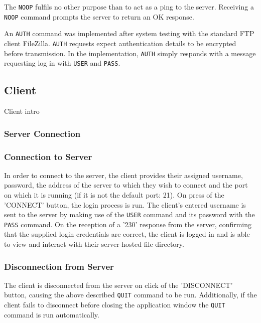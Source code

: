 \documentclass[10pt,twocolumn]{witseiepaper}
\begin{document}
The \texttt{NOOP} fulfils no other purpose than to act as a ping to the server. Receiving a \texttt{NOOP} command prompts the server to return an OK response.

An \texttt{AUTH} command was implemented after system testing with the standard FTP client FileZilla. \texttt{AUTH} requests expect authentication details to be encrypted before transmission. In the implementation, \texttt{AUTH} simply responds with a message requesting log in with \texttt{USER} and \texttt{PASS}.


\subsection{Client}



Client intro


\subsubsection{Server Connection}
\subsubsection*{Connection to Server}
In order to connect to the server, the client provides their assigned username, password, the address of the server to which they wish to connect and the port on which it is running (if it is not the default port: 21). On press of the 'CONNECT' button, the login process is run. The client's entered username is sent to the server by making use of the \texttt{USER} command and its password with the \texttt{PASS} command. On the reception of a '230' response from the server, confirming that the supplied login credentials are correct, the client is logged in and is able to view and interact with their server-hosted file directory.
 
\subsubsection*{Disconnection from Server} 
The client is disconnected from the server on click of the 'DISCONNECT' button, causing the above described \texttt{QUIT} command to be run. Additionally, if the client fails to disconnect before closing the application window the \texttt{QUIT} command is run automatically.
\end{document}
